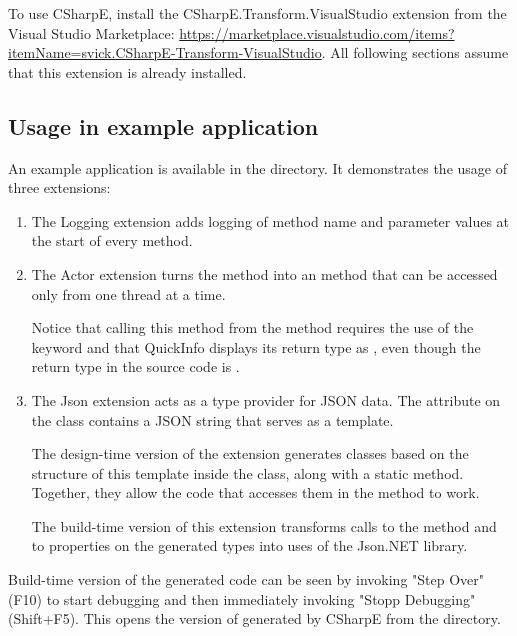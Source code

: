To use CSharpE, install the CSharpE.Transform.VisualStudio extension from the Visual Studio Marketplace: \url{https://marketplace.visualstudio.com/items?itemName=svick.CSharpE-Transform-VisualStudio}. All following sections assume that this extension is already installed.

\subsection{Usage in example application}

An example application is available in the  directory. It demonstrates the usage of three extensions:

\begin{enumerate}
\item The Logging extension adds logging of method name and parameter values at the start of every method.

\item The Actor extension turns the method  into an  method that can be accessed only from one thread at a time.

Notice that calling this method from the  method requires the use of the  keyword and that QuickInfo displays its return type as , even though the return type in the source code is .

\item The Json extension acts as a type provider for JSON data. The attribute on the   class contains a JSON string that serves as a template.

The design-time version of the extension generates classes based on the structure of this template inside the  class, along with a static  method. Together, they allow the code that accesses them in the method  to work.

The build-time version of this extension transforms calls to the  method and to properties on the generated types into uses of the Json.NET library.
\end{enumerate}


Build-time version of the generated code can be seen by invoking "Step Over" (F10) to start debugging and then immediately invoking "Stopp Debugging" (Shift+F5). This opens the version of  generated by CSharpE from the  directory.

